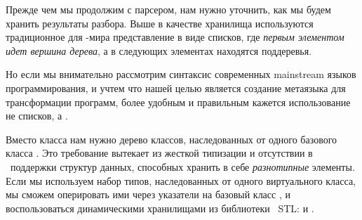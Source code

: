 
Прежде чем мы продолжим с парсером, нам нужно уточнить, как мы
будем хранить результаты разбора. Выше в качестве хранилища  используются традиционное для \lisp-мира представление
в виде списков, где \emph{первым элементом идет вершина дерева}, а в следующих
элементах находятся поддеревья.

Но если мы внимательно рассмотрим синтаксис современных main\-stream языков
программирования, и учтем что нашей целью
является создание метаязыка для трансформации программ, более удобным и
правильным кажется использование не списков, а .

Вместо класса  нам нужно дерево классов, наследованных от одного
 базового класса . Это требование вытекает из
жесткой типизации и отсутствии в \cpp\ поддержки  структур
данных, способных хранить в себе \emph{разнотипные} элементы. Если мы
используем набор типов, наследованных от одного виртуального класса, мы сможем оперировать ими
через указатели на базовый класс , и воспользоваться динамическими
хранилищами из библиотеки \cpp\ STL:  и
.


